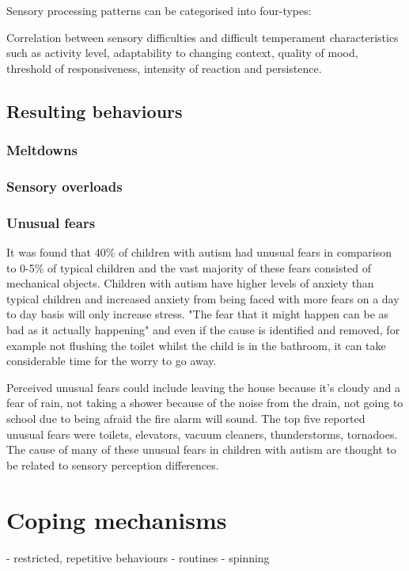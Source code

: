 \documentclass[11pt]{report}
\begin{document}
Sensory processing patterns can be categorised into four-types\cite{sensory_leisure}:

Correlation between sensory difficulties and difficult temperament characteristics such as activity level, adaptability to changing context, quality of mood, threshold of responsiveness, intensity of reaction and persistence\cite{temperament}. 

\subsection{Resulting behaviours}

\subsubsection{Meltdowns}

\subsubsection{Sensory overloads}

\subsubsection{Unusual fears}
It was found that 40\% of children with autism had unusual fears in comparison to 0-5\% of typical children and the vast majority of these fears consisted of mechanical objects. Children with autism have higher levels of anxiety than typical children\cite{fears} and increased anxiety from being faced with more fears on a day to day basis will only increase stress. "The fear that it might happen can be as bad as it actually happening" and even if the cause is identified and removed, for example not flushing the toilet whilst the child is in the bathroom, it can take considerable time for the worry to go away.

Perceived unusual fears could include leaving the house because it's cloudy and a fear of rain, not taking a shower because of the noise from the drain, not going to school due to being afraid the fire alarm will sound. The top five reported unusual fears were toilets, elevators, vacuum cleaners, thunderstorms, tornadoes. The cause of many of these unusual fears in children with autism are thought to be related to sensory perception differences\cite{fears}.

\section{Coping mechanisms}
- restricted, repetitive behaviours
- routines
- spinning
\end{document}
